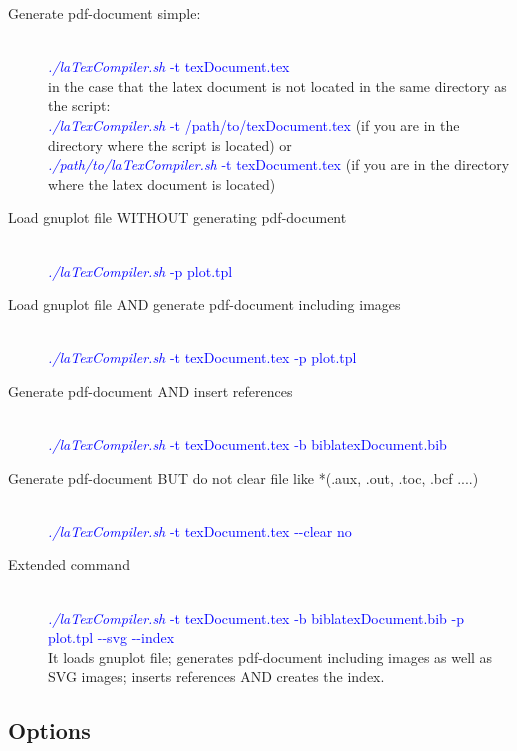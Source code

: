 \documentclass[11pt,a4paper,twoside]{article}
\begin{document}
	\begin{description}
		\item[Generate pdf-document simple:]$\,$\\ 
			 \textcolor{blue}{\textit{./laTexCompiler.sh} -t texDocument.tex}\\
			 in the case that the latex document is not located in the same directory as the script:\\
			 \qquad\textcolor{blue}{\textit{./laTexCompiler.sh} -t /path/to/texDocument.tex} (if you are in the directory where the script is located)
			 \qquad or \\
			 \qquad\textcolor{blue}{\textit{./path/to/laTexCompiler.sh} -t texDocument.tex} (if you are in the directory where the latex document is located)

		\item[Load gnuplot file WITHOUT generating pdf-document]$\,$\\ 
			\textcolor{blue}{\textit{./laTexCompiler.sh} -p plot.tpl}

		\item[Load gnuplot file AND generate pdf-document including images]$\,$\\ 
			\textcolor{blue}{\textit{./laTexCompiler.sh} -t texDocument.tex -p plot.tpl}

		\item[Generate pdf-document AND insert references]$\,$\\ 
			\textcolor{blue}{\textit{./laTexCompiler.sh} -t texDocument.tex -b biblatexDocument.bib}

		\item[Generate pdf-document BUT do not clear file like *(.aux, .out, .toc, .bcf ....)]$\,$\\
			\textcolor{blue}{\textit{./laTexCompiler.sh}  -t texDocument.tex -{}-clear no}

		\item[Extended command]$\,$\\ 
			\textcolor{blue}{\textit{./laTexCompiler.sh} -t texDocument.tex -b biblatexDocument.bib -p plot.tpl -{}-svg -{}-index}\\
			It loads gnuplot file; generates pdf-document including images as well as SVG images; inserts references AND creates the index.

	\end{description}

	
	\subsection{Options}
	 
\end{document}
